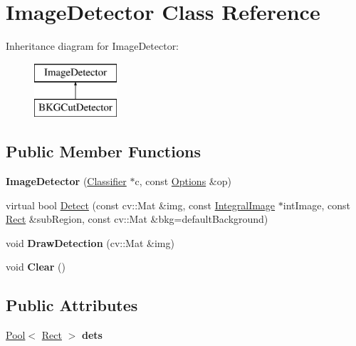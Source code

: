\hypertarget{classImageDetector}{}\section{Image\+Detector Class Reference}
\label{classImageDetector}
Inheritance diagram for Image\+Detector\+:\begin{figure}[H]
\begin{center}
\leavevmode
\includegraphics[height=2.000000cm]{classImageDetector}
\end{center}
\end{figure}
\subsection*{Public Member Functions}
\begin{DoxyCompactItemize}
\item 
\hypertarget{classImageDetector_a46465717138658c7f29146d4aa057d98}{}{\bfseries Image\+Detector} (\hyperlink{classClassifier}{Classifier} $\ast$c, const \hyperlink{structOptions}{Options} \&op)\label{classImageDetector_a46465717138658c7f29146d4aa057d98}

\item 
virtual bool \hyperlink{classImageDetector_ae04e532f1de2cb8da3b514b7585ef624}{Detect} (const cv\+::\+Mat \&img, const \hyperlink{classIntegralImage}{Integral\+Image} $\ast$int\+Image, const \hyperlink{classRect}{Rect} \&sub\+Region, const cv\+::\+Mat \&bkg=default\+Background)
\item 
\hypertarget{classImageDetector_a866cc9f2e6b109ea8a897e96c4b106a1}{}void {\bfseries Draw\+Detection} (cv\+::\+Mat \&img)\label{classImageDetector_a866cc9f2e6b109ea8a897e96c4b106a1}

\item 
\hypertarget{classImageDetector_a2293f8558975b3404dae1ed077d47580}{}void {\bfseries Clear} ()\label{classImageDetector_a2293f8558975b3404dae1ed077d47580}

\end{DoxyCompactItemize}
\subsection*{Public Attributes}
\begin{DoxyCompactItemize}
\item 
\hypertarget{classImageDetector_a8efe2a2273f8089879c570bc471ba8dc}{}\hyperlink{classPool}{Pool}$<$ \hyperlink{classRect}{Rect} $>$ {\bfseries dets}\label{classImageDetector_a8efe2a2273f8089879c570bc471ba8dc}

\end{DoxyCompactItemize}
